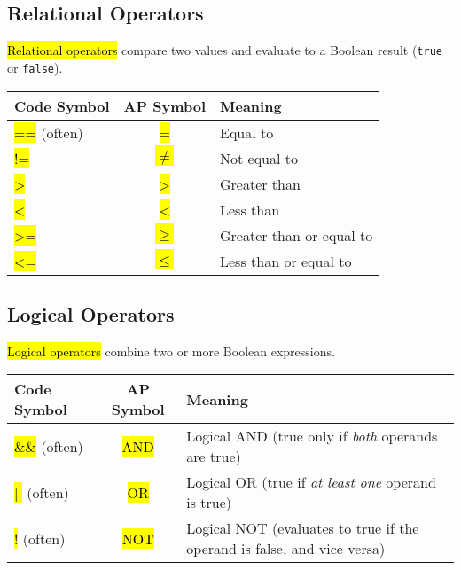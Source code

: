 \documentclass[11pt,oneside]{book}
\newcommand{\hlc}[2][hlyellow]{\sethlcolor{#1}\hl{#2}}
\begin{document}
\subsection*{Relational Operators}
\hlc[hlyellow]{Relational operators} compare two values and evaluate to a Boolean result (\texttt{true} or \texttt{false}).

\begin{tabularx}{\textwidth}{>{\ttfamily}l >{\ttfamily}c X}
\toprule
\textbf{Code Symbol} & \textbf{AP Symbol} & \textbf{Meaning} \\
\midrule
\hlc[hlyellow]{==} (often) & \hlc[hlyellow]{=} & Equal to \\
\hlc[hlyellow]{!=} & \hlc[hlyellow]{$\neq$} & Not equal to \\
\hlc[hlyellow]{>} & \hlc[hlyellow]{>} & Greater than \\
\hlc[hlyellow]{<} & \hlc[hlyellow]{<} & Less than \\
\hlc[hlyellow]{>=} & \hlc[hlyellow]{$\geq$} & Greater than or equal to \\
\hlc[hlyellow]{<=} & \hlc[hlyellow]{$\leq$} & Less than or equal to \\
\bottomrule
\end{tabularx}

\subsection*{Logical Operators}
\hlc[hlred]{Logical operators} combine two or more Boolean expressions.

\begin{tabularx}{\textwidth}{>{\ttfamily}l >{\ttfamily}c X}
\toprule
\textbf{Code Symbol} & \textbf{AP Symbol} & \textbf{Meaning} \\
\midrule
\hlc[hlred]{\&\&} (often) & \hlc[hlred]{AND} & Logical AND (true only if \textit{both} operands are true) \\
\hlc[hlred]{||} (often) & \hlc[hlred]{OR} & Logical OR (true if \textit{at least one} operand is true) \\
\hlc[hlred]{!} (often) & \hlc[hlred]{NOT} & Logical NOT (evaluates to true if the operand is false, and vice versa) \\
\bottomrule
\end{tabularx}
\end{document}
